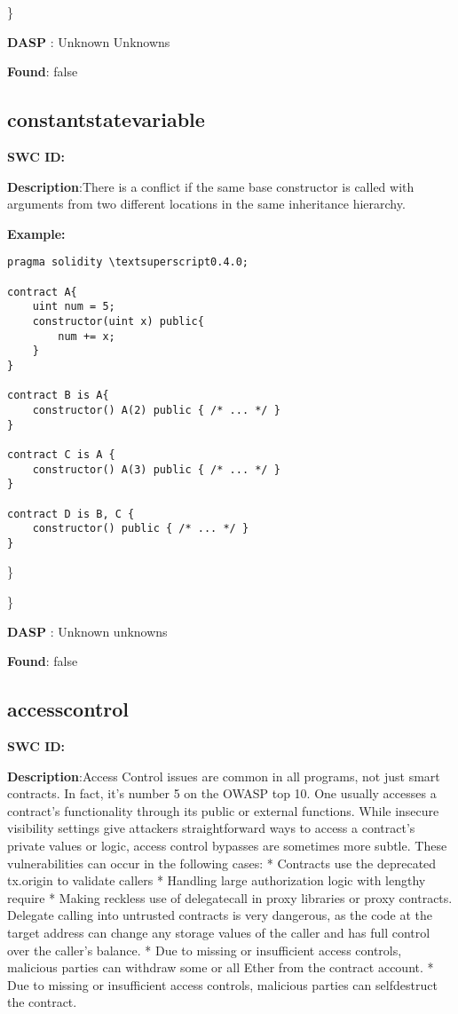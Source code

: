\documentclass{article}
\begin{document}
\} 

\textbf{DASP} : Unknown Unknowns

\textbf{Found}: false

\subsection{constant\textunderscore state\textunderscore variable} 
\textbf{SWC \textunderscore ID:} 

\textbf{Description}:There is a conflict if the same base constructor is called with arguments from two different locations in the same inheritance hierarchy.


\textbf{Example:} 
\begin{verbatim}
pragma solidity \textsuperscript0.4.0;

contract A{
    uint num = 5;
    constructor(uint x) public{
        num += x;
    }
}

contract B is A{
    constructor() A(2) public { /* ... */ }
}

contract C is A {
    constructor() A(3) public { /* ... */ }
}

contract D is B, C {
    constructor() public { /* ... */ }
}

\end{verbatim}\} 

\} 

\textbf{DASP} : Unknown unknowns

\textbf{Found}: false

\subsection{access\textunderscore control} 
\textbf{SWC \textunderscore ID:} 

\textbf{Description}:Access Control issues are common in all programs, not just smart contracts. In fact, it's number 5 on the OWASP top 10. One usually accesses a contract's functionality through its public or external functions. While insecure visibility settings give attackers straightforward ways to access a contract's private values or logic, access control bypasses are sometimes more subtle. These vulnerabilities can occur in the following cases:
* Contracts use the deprecated tx.origin to validate callers
* Handling large authorization logic with lengthy require
* Making reckless use of delegatecall in proxy libraries or proxy contracts. Delegate calling into untrusted contracts is very dangerous, as the code at the target address can change any storage values of the caller and has full control over the caller's balance.
* Due to missing or insufficient access controls, malicious parties can withdraw some or all Ether from the contract account.
* Due to missing or insufficient access controls, malicious parties can self\textendash destruct the contract.
\end{document}
